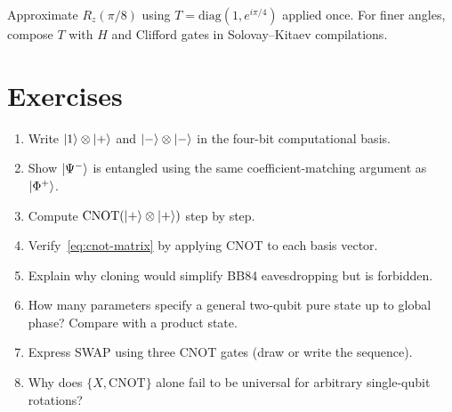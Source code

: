 \begin{example}
Approximate $R_z(\pi/8)$ using $T=\mathrm{diag}(1,e^{i\pi/4})$ applied once. For finer angles, compose $T$ with $H$ and Clifford gates in Solovay--Kitaev compilations.
\end{example}

\section*{Exercises}
\begin{enumerate}[label=\arabic*.]
\item Write $\ket{1}\otimes\ket{+}$ and $\ket{-}\otimes\ket{-}$ in the four-bit computational basis.
\item Show $\ket{\Psi^-}$ is entangled using the same coefficient-matching argument as $\ket{\Phi^+}$.
\item Compute $\mathrm{CNOT}(\ket{+}\otimes\ket{+})$ step by step.
\item Verify~\eqref{eq:cnot-matrix} by applying CNOT to each basis vector.
\item Explain why cloning would simplify BB84 eavesdropping but is forbidden.
\item How many parameters specify a general two-qubit pure state up to global phase? Compare with a product state.
\item Express SWAP using three CNOT gates (draw or write the sequence).
\item Why does $\{X,\mathrm{CNOT}\}$ alone fail to be universal for arbitrary single-qubit rotations?
\end{enumerate}
